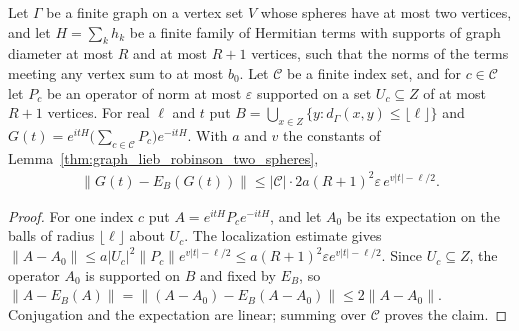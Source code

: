 \begin{lemma}
    \label{lem:graph_evolved_perturbation_localization}
    \leanok
    Let $\Gamma$ be a finite graph on a vertex set $V$ whose spheres have at
    most two vertices, and let $H=\sum_k h_k$ be a finite family of Hermitian
    terms with supports of graph diameter at most $R$ and at most $R+1$
    vertices, such that the norms of the terms meeting any vertex sum to at
    most $b_0$. Let $\mathcal C$ be a finite index set, and for $c\in\mathcal C$
    let $P_c$ be an operator of norm at most $\varepsilon$ supported on a set
    $U_c\subseteq Z$ of at most $R+1$ vertices. For real $\ell$ and $t$ put
    $B=\bigcup_{x\in Z}\{y:d_\Gamma(x,y)\le\lfloor\ell\rfloor\}$ and
    $G(t)=e^{itH}\bigl(\sum_{c\in\mathcal C}P_c\bigr)e^{-itH}$. With $a$ and
    $v$ the constants of Lemma~\ref{thm:graph_lieb_robinson_two_spheres},
    \begin{align}
        \|G(t)-E_B(G(t))\|
        \le|\mathcal C|\cdot2a(R+1)^2\varepsilon\,e^{v|t|-\ell/2}.
    \end{align}
\end{lemma}
\begin{proof}
    \leanok
    For one index $c$ put $A=e^{itH}P_ce^{-itH}$, and let $A_0$ be its
    expectation on the balls of radius $\lfloor\ell\rfloor$ about $U_c$. The
    localization estimate gives
    $\|A-A_0\|\le a|U_c|^2\|P_c\|e^{v|t|-\ell/2}\le a(R+1)^2\varepsilon
        e^{v|t|-\ell/2}$. Since $U_c\subseteq Z$, the operator $A_0$ is
    supported on $B$ and fixed by $E_B$, so
    $\|A-E_B(A)\|=\|(A-A_0)-E_B(A-A_0)\|\le2\|A-A_0\|$. Conjugation and the
    expectation are linear; summing over $\mathcal C$ proves the claim.
\end{proof}

